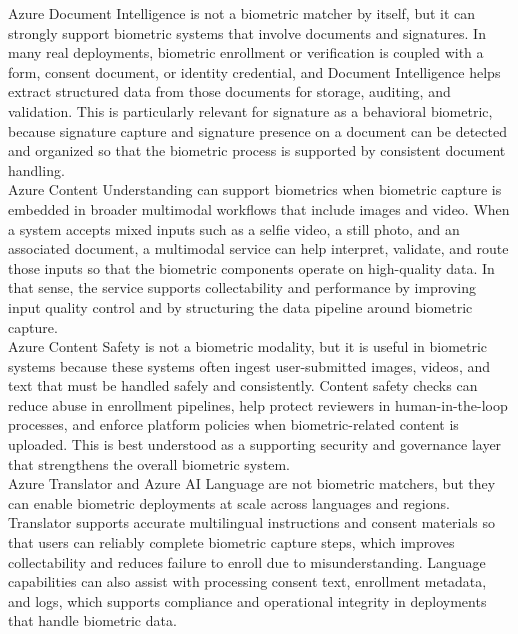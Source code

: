 \documentclass[11pt]{article}
\begin{document}
Azure Document Intelligence is not a biometric matcher by itself, but it can strongly support biometric systems that involve documents and signatures. In many real deployments, biometric enrollment or verification is coupled with a form, consent document, or identity credential, and Document Intelligence helps extract structured data from those documents for storage, auditing, and validation. This is particularly relevant for signature as a behavioral biometric, because signature capture and signature presence on a document can be detected and organized so that the biometric process is supported by consistent document handling. \\

Azure Content Understanding can support biometrics when biometric capture is embedded in broader multimodal workflows that include images and video. When a system accepts mixed inputs such as a selfie video, a still photo, and an associated document, a multimodal service can help interpret, validate, and route those inputs so that the biometric components operate on high-quality data. In that sense, the service supports collectability and performance by improving input quality control and by structuring the data pipeline around biometric capture. \\

Azure Content Safety is not a biometric modality, but it is useful in biometric systems because these systems often ingest user-submitted images, videos, and text that must be handled safely and consistently. Content safety checks can reduce abuse in enrollment pipelines, help protect reviewers in human-in-the-loop processes, and enforce platform policies when biometric-related content is uploaded. This is best understood as a supporting security and governance layer that strengthens the overall biometric system. \\

Azure Translator and Azure AI Language are not biometric matchers, but they can enable biometric deployments at scale across languages and regions. Translator supports accurate multilingual instructions and consent materials so that users can reliably complete biometric capture steps, which improves collectability and reduces failure to enroll due to misunderstanding. Language capabilities can also assist with processing consent text, enrollment metadata, and logs, which supports compliance and operational integrity in deployments that handle biometric data. \\
\end{document}
